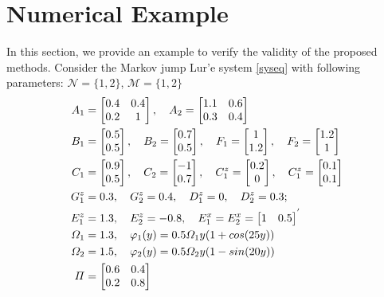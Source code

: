 \documentclass[conference]{IEEEtran}
\begin{document}
\section{Numerical Example}
In this section, we provide an example to verify the validity of the proposed methods. Consider the Markov jump Lur'e system \eqref{syseq} with following parameters: $\mathcal{N}=\{1,2\}$, $\mathcal{M}=\{1,2\}$ 
\begin{equation} \notag
	\begin{aligned}
		A_{1}&=\begin{bmatrix}
			0.4&0.4\\
			0.2&1
		\end{bmatrix}, \quad
		A_{2}=\begin{bmatrix}
			1.1&0.6\\
			0.3&0.4
		\end{bmatrix}\\     
		B_{1}&=\begin{bmatrix}
		0.5\\0.5
		\end{bmatrix}, \quad
		B_2 = \begin{bmatrix}
		0.7\\0.5
		\end{bmatrix}, \quad
		F_{1}=\begin{bmatrix}
		1\\1.2
		\end{bmatrix},\quad
		F_{2}=\begin{bmatrix}
		1.2\\1
		\end{bmatrix}
		\\
		C_{1}&=\begin{bmatrix}
		0.9\\0.5
		\end{bmatrix},\quad
		C_{2}=\begin{bmatrix}
		-1\\0.7
		\end{bmatrix},\quad
		C^{z}_{1}=\begin{bmatrix}
		0.2\\0
		\end{bmatrix},\quad
		C^{z}_{1}=\begin{bmatrix}
		0.1\\0.1
		\end{bmatrix} \\       
		G^{z}_{1}& = 0.3,\quad G^{z}_{2} = 0.4,\quad D^{z}_{1} = 0,\quad D^{z}_{2} = 0.3;\\
		E^{z}_{1}&= 1.3,\quad E^{z}_{2} = -0.8,\quad 	E^{x}_{1} = E^{x}_{2}= \begin{bmatrix} 
			1&0.5
		\end{bmatrix}^{'}\\
		\varOmega_{1}&=1.3, \quad \varphi_{1}(y)=0.5\varOmega_{1}y(1+cos(25y)) \\ 
		\varOmega_{2}&=1.5,\quad \varphi_{2}(y)=0.5\varOmega_{2}y(1-sin(20y)) \\
		\varPi&=\begin{bmatrix}
			0.6&0.4\\
			0.2&0.8
		\end{bmatrix}
	\end{aligned}  
\end{equation}
\end{document}
